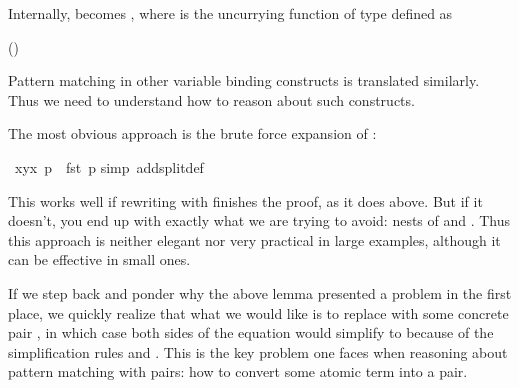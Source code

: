 \begin{isabellebody}
\begin{isamarkuptext}
Internally,  becomes , where
is the uncurrying function of type  defined as
\begin{center}
\hfill()
\end{center}
Pattern matching in
other variable binding constructs is translated similarly. Thus we need to
understand how to reason about such constructs.%
\end{isamarkuptext}%
%
%
\begin{isamarkuptext}%
The most obvious approach is the brute force expansion of :%
\end{isamarkuptext}%
\ {\isachardoublequote}{\isacharparenleft}{\isasymlambda}{\isacharparenleft}x{\isacharcomma}y{\isacharparenright}{\isachardot}x{\isacharparenright}\ p\ {\isacharequal}\ fst\ p{\isachardoublequote}\isanewline
{}simp\ add{\isacharcolon}split{\isacharunderscore}def{\isacharparenright}%
\begin{isamarkuptext}%
This works well if rewriting with  finishes the
proof, as it does above.  But if it doesn't, you end up with exactly what
we are trying to avoid: nests of  and . Thus this
approach is neither elegant nor very practical in large examples, although it
can be effective in small ones.

If we step back and ponder why the above lemma presented a problem in the
first place, we quickly realize that what we would like is to replace  with some concrete pair , in which case both sides of the
equation would simplify to  because of the simplification rules
 and .  This is the
key problem one faces when reasoning about pattern matching with pairs: how to
convert some atomic term into a pair.


\end{isamarkuptext}
\end{isabellebody}
